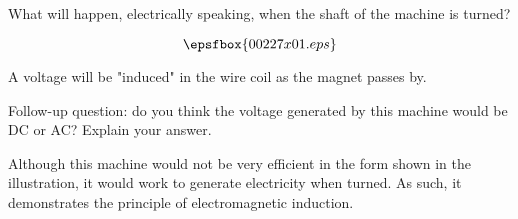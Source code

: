 

What will happen, electrically speaking, when the shaft of the machine is turned?

$$\epsfbox{00227x01.eps}$$







A voltage will be "induced" in the wire coil as the magnet passes by.

\vskip 10pt

Follow-up question: do you think the voltage generated by this machine would be DC or AC?  Explain your answer.







Although this machine would not be very efficient in the form shown in the illustration, it would work to generate electricity when turned.  As such, it demonstrates the principle of electromagnetic induction.




